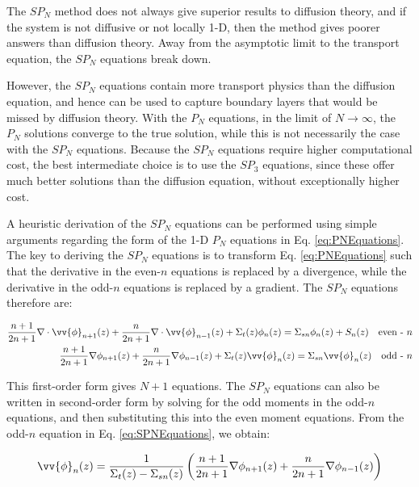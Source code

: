 \documentclass[10pt]{article}
\begin{document}
\begin{flushleft}
The \(SP_N\) method does not always give superior results to diffusion theory, and if the system is not diffusive or not locally 1-D, then the method gives poorer answers than diffusion theory. Away from the asymptotic limit to the transport equation, the \(SP_N\) equations break down. 

However, the \(SP_N\) equations contain more transport physics than the diffusion equation, and hence can be used to capture boundary layers that would be missed by diffusion theory. With the \(P_N\) equations, in the limit of \(N\rightarrow\infty\), the \(P_N\) solutions converge to the true solution, while this is not necessarily the case with the \(SP_N\) equations. Because the \(SP_N\) equations require higher computational cost, the best intermediate choice is to use the \(SP_3\) equations, since these offer much better solutions than the diffusion equation, without exceptionally higher cost.

A heuristic derivation of the \(SP_N\) equations can be performed using simple arguments regarding the form of the 1-D \(P_N\) equations in Eq. \eqref{eq:PNEquations}. The key to deriving the \(SP_N\) equations is to transform Eq. \eqref{eq:PNEquations} such that the derivative in the even-\(n\) equations is replaced by a divergence, while the derivative in the odd-\(n\) equations is replaced by a gradient. The \(SP_N\) equations therefore are:

\begin{equation}
\label{eq:SPNEquations}
\begin{aligned}
\frac{n+1}{2n+1}\nabla\cdot\vv{\phi}_{n+1}(z)+\frac{n}{2n+1}\nabla\cdot\vv{\phi}_{n-1}(z)+ \Sigma_t(z)\phi_n(z)=\Sigma_{sn}\phi_n(z)+ S_n(z)\quad \textrm{even - } n\\
\frac{n+1}{2n+1}\nabla\phi_{n+1}(z)+\frac{n}{2n+1}\nabla\phi_{n-1}(z)+ \Sigma_t(z)\vv{\phi}_n(z)=\Sigma_{sn}\vv{\phi}_n(z)\quad \textrm{odd - } n\\
\end{aligned}
 \end{equation}

This first-order form gives \(N+1\) equations. The \(SP_N\) equations can also be written in second-order form by solving for the odd moments in the odd-\(n\) equations, and then substituting this into the even moment equations. From the odd-\(n\) equation in Eq. \eqref{eq:SPNEquations}, we obtain:

\begin{equation}
\vv{\phi}_n(z)=\frac{1}{\Sigma_t(z)-\Sigma_{sn}(z)}\left(\frac{n+1}{2n+1}\nabla\phi_{n+1}(z)+\frac{n}{2n+1}\nabla\phi_{n-1}(z)\right)
\end{equation}


\end{flushleft}
\end{document}
